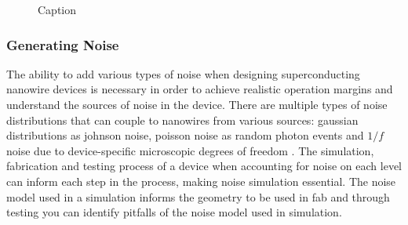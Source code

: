 \documentclass[]{article}
\newcommand{\todoref}[2][]{}
\newcommand{\todofig}[2][]{}
\newcommand{\todoidea}[2][]{}
\begin{document}
\begin{figure}
    \centering
    \caption{Caption}
    \label{fig:taper_pnr}
\end{figure}

\todoidea[inline]{PNR!}

\todofig[]{pnr}

\subsubsection{Generating Noise} \label{gen_noise}

\todoref[]{somewhere: cite adam_noise}
\todoref[]{@INPROCEEDINGS{8990925,
  author={Qu, Ashley and Zhu, Di and Berggren, Karl K.},
  booktitle={2019 IEEE International Superconductive Electronics Conference (ISEC)}, 
  title={Noise Contribution to Switching Current Distributions in NbN Nanowires}, 
  year={2019},
  volume={},
  number={},
  pages={1-3},
  doi={10.1109/ISEC46533.2019.8990925}}
  }

The ability to add various types of noise when designing superconducting nanowire devices is necessary in order to achieve realistic operation margins and understand the sources of noise in the device. There are multiple types of noise distributions that can couple to nanowires from various sources: gaussian distributions as johnson noise, poisson noise
as random photon events and $1/f$ noise due to device-specific microscopic degrees of freedom \cite{1overfinsc}. The simulation, fabrication and testing process of a device
when accounting for noise on each level can inform each step in the process, making noise
simulation essential. The noise model used in a simulation informs the geometry to be 
used in fab and through testing you can identify pitfalls of the noise model used
in simulation.
\end{document}
